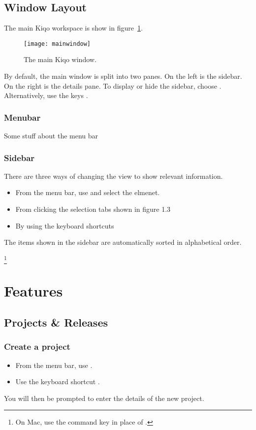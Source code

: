 \documentclass[11pt,fleqn]{book} %
\begin{document}
\section{Window Layout}
The main Kiqo workspace is show in figure~\ref{fig:mainwindow}.

\begin{figure}[h]
  \centering
  \texttt{[image: mainwindow]}
  \caption{The main Kiqo window.\label{fig:mainwindow}}
\end{figure}

By default, the main window is split into two panes. On the left is the sidebar. On the right is the details pane.
To display or hide the sidebar, choose . Alternatively, use the keys .

\subsection{Menubar}
Some stuff about the menu bar

\subsection{Sidebar}
There are three ways of changing the view to show relevant information.
\begin{itemize}
  \item From the menu bar, use  and select the elmenet.
  \item From clicking the selection tabs shown in figure 1.3
  \item By using the keyboard shortcuts 
\end{itemize}
The items shown in the sidebar are automatically sorted in alphabetical order.

\footnote{On Mac, use the command key \keys{\cmd} in place of \keys{\ctrl}.}



\chapter{Features}
\section{Projects \& Releases}
\subsection{Create a project}
    \begin{itemize}
        \item From the menu bar, use .
        \item Use the keyboard shortcut .
    \end{itemize}
    You will then be prompted to enter the details of the new project.
\end{document}
